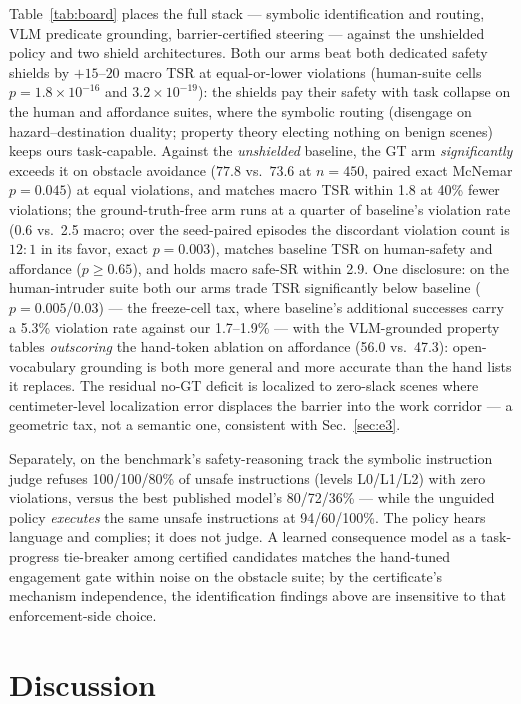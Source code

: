 \documentclass[conference]{IEEEtran}
\begin{document}
Table~\ref{tab:board} places the full stack --- symbolic identification and routing, VLM predicate grounding, barrier-certified steering --- against the unshielded policy and two shield architectures. Both our arms beat both dedicated safety shields by $+15$--$20$ macro TSR at equal-or-lower violations (human-suite cells $p{=}1.8{\times}10^{-16}$ and $3.2{\times}10^{-19}$): the shields pay their safety with task collapse on the human and affordance suites, where the symbolic routing (disengage on hazard--destination duality; property theory electing nothing on benign scenes) keeps ours task-capable. Against the \emph{unshielded} baseline, the GT arm \emph{significantly} exceeds it on obstacle avoidance ($77.8$ vs.\ $73.6$ at $n{=}450$, paired exact McNemar $p{=}0.045$) at equal violations, and matches macro TSR within 1.8 at 40\% fewer violations; the ground-truth-free arm runs at a quarter of baseline's violation rate (0.6 vs.\ 2.5 macro; over the seed-paired episodes the discordant violation count is $12{:}1$ in its favor, exact $p{=}0.003$), matches baseline TSR on human-safety and affordance ($p{\ge}0.65$), and holds macro safe-SR within 2.9. One disclosure: on the human-intruder suite both our arms trade TSR significantly below baseline ($p{=}0.005$/$0.03$) --- the freeze-cell tax, where baseline's additional successes carry a 5.3\% violation rate against our 1.7--1.9\% --- with the VLM-grounded property tables \emph{outscoring} the hand-token ablation on affordance (56.0 vs.\ 47.3): open-vocabulary grounding is both more general and more accurate than the hand lists it replaces. The residual no-GT deficit is localized to zero-slack scenes where centimeter-level localization error displaces the barrier into the work corridor --- a geometric tax, not a semantic one, consistent with Sec.~\ref{sec:e3}.

Separately, on the benchmark's safety-reasoning track the symbolic instruction judge refuses 100/100/80\% of unsafe instructions (levels L0/L1/L2) with zero violations, versus the best published model's 80/72/36\% --- while the unguided policy \emph{executes} the same unsafe instructions at 94/60/100\%. The policy hears language and complies; it does not judge. A learned consequence model as a task-progress tie-breaker among certified candidates matches the hand-tuned engagement gate within noise on the obstacle suite; by the certificate's mechanism independence, the identification findings above are insensitive to that enforcement-side choice.

\section{Discussion}
\label{sec:discussion}
\end{document}
